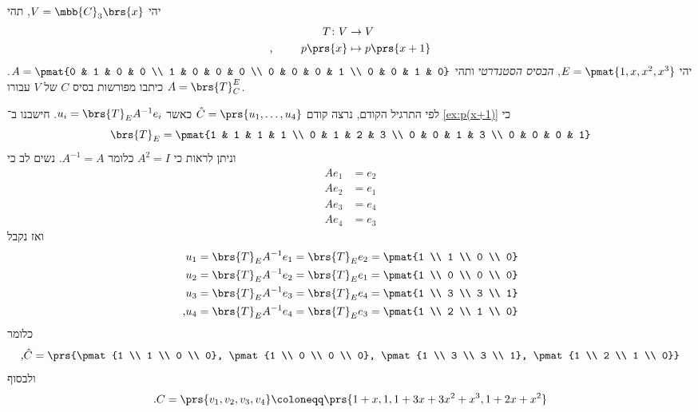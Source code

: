 \documentclass[a4paper,10pt,twoside,openany]{book}
\begin{document}
\begin{exercisechap}
יהי
$V = \mbb{C}_3\brs{x}$,
תהי
\begin{align*}
T \colon V &\to V \\
\text{,} \hphantom{lalala} p\prs{x} &\mapsto p\prs{x+1}
\end{align*}
יהי
$E = \pmat{1,x,x^2,x^3}$,
\emph{הבסיס הסטנדרטי}
ותהי
$A = \pmat{0 & 1 & 0 & 0 \\ 1 & 0 & 0 & 0 \\ 0 & 0 & 0 & 1 \\ 0 & 0 & 1 & 0}$.
כיתבו מפורשות בסיס
$C$
של
$V$
עבורו
$A = \brs{T}^E_C$.
\end{exercisechap}

\begin{solution}
לפי התרגיל הקודם, נרצה קודם
$\hat{C} = \prs{u_1, \ldots, u_4}$
כאשר
$u_i = \brs{T}_E A^{-1} e_i$.
חישבנו ב־%
\ref{ex:p(x+1)}
כי
\[\brs{T}_E = \pmat{1 & 1 & 1 & 1 \\ 0 & 1 & 2 & 3 \\ 0 & 0 & 1 & 3 \\ 0 & 0 & 0 & 1}\]
וניתן לראות כי
$A^2 = I$
כלומר
$A^{-1} = A$.
נשים לב כי
\begin{align*}
A e_1 &= e_2 \\
A e_2 &= e_1 \\
A e_3 &= e_4 \\
A e_4 &= e_3
\end{align*}
ואז נקבל
\begin{align*}
u_1 &= \brs{T}_E A^{-1} e_1 = \brs{T}_E e_2 = \pmat{1 \\ 1 \\ 0 \\ 0} \\
u_2 &= \brs{T}_E A^{-1} e_2 = \brs{T}_E e_1 = \pmat{1 \\ 0 \\ 0 \\ 0} \\
u_3 &= \brs{T}_E A^{-1} e_3 = \brs{T}_E e_4 = \pmat{1 \\ 3 \\ 3 \\ 1} \\
\text{,} u_4 &= \brs{T}_E A^{-1} e_4 = \brs{T}_E e_3 = \pmat{1 \\ 2 \\ 1 \\ 0}
\end{align*}
כלומר
\[\text{,} \hat{C} = \prs{\pmat{1 \\ 1 \\ 0 \\ 0}, \pmat{1 \\ 0 \\ 0 \\ 0}, \pmat{1 \\ 3 \\ 3 \\ 1}, \pmat{1 \\ 2 \\ 1 \\ 0}}\]
ולבסוף
\[\text{.} C = \prs{v_1, v_2, v_3, v_4} \coloneqq \prs{1+x, 1, 1+3x+3x^2+x^3, 1+2x+x^2}\]


\end{solution}
\end{document}
